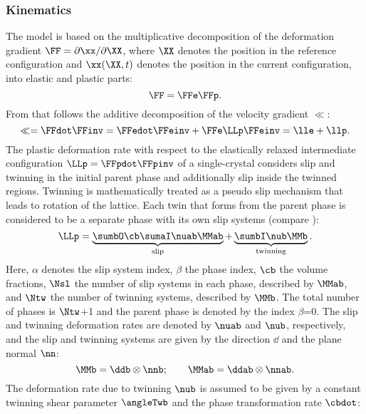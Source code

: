\subsubsection{Kinematics}
  The model is based on the multiplicative decomposition of the deformation gradient $\FF=\partial \xx / \partial \XX$, where $\XX$ denotes the position in the reference configuration and $\xx(\XX,t)$ denotes the position in the current configuration, into elastic and plastic parts\supercite{kroener1959allgemeine,lee1969elastic-plastic}:
  \begin{equation}
      \FF = \FFe \FFp.
      \label{eq:DecompF}
  \end{equation}
  From that follows the additive decomposition of the velocity gradient $\ll$:
  \begin{equation}
          \ll = \FFdot \FFinv = \FFedot\FFeinv + \FFe \LLp \FFeinv = \lle + \llp.
  \end{equation}
  The plastic deformation rate with respect to the elastically relaxed intermediate configuration \mbox{$\LLp=\FFpdot\FFpinv$} of a single-crystal considers slip and twinning in the initial parent phase and additionally slip inside the twinned regions. Twinning is mathematically treated as a pseudo slip mechanism that leads to rotation of the lattice. Each twin that forms from the parent phase is considered to be a separate phase with its own slip systems (compare ):   
  \begin{equation}
    \LLp = \underbrace{\sumbO \cb \sumaI \nuab \MMab}_{\text{slip}} + \underbrace{\sumbI \nub \MMb}_{\text{twinning}}.
    \label{eq:LLp}
  \end{equation}
  Here, $\alpha$ denotes the slip system index, $\beta$ the phase index, $\cb$ the volume fractions, $\Nsl$ the number of slip systems in each phase, described by $\MMab$, and $\Ntw$ the number of twinning systems, described by $\MMb$. The total number of phases is $\Ntw$+1 and the parent phase is denoted by the index $\beta$=0. The slip and twinning deformation rates are denoted by $\nuab$ and $\nub$, respectively, and the slip and twinning systems are given by the direction $\dd$ and the plane normal $\nn$: 
  \begin{equation}
      \MMb = \ddb \otimes \nnb; \qquad \MMab = \ddab \otimes \nnab.
      \label{eq:MM}
  \end{equation}
  The deformation rate due to twinning $\nub$ is assumed to be given by a constant twinning shear parameter $\angleTwb$ and the phase transformation rate $\cbdot$:
